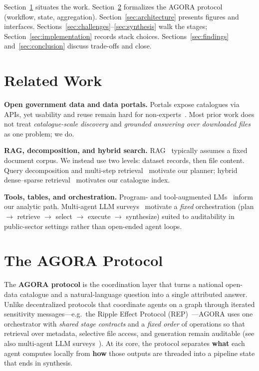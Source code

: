 \documentclass[sigconf,anonymous]{acmart}
\begin{document}
Section~\ref{sec:related} situates the work. Section~\ref{sec:protocol} formalizes the AGORA protocol (workflow, state, aggregation). Section~\ref{sec:architecture} presents figures and interfaces. Sections~\ref{sec:challenges}--\ref{sec:synthesis} walk the stages; Section~\ref{sec:implementation} records stack choices. Sections~\ref{sec:findings} and~\ref{sec:conclusion} discuss trade-offs and close.

\section{Related Work}
\label{sec:related}

\textbf{Open government data and data portals.} Portals expose catalogues via APIs, yet usability and reuse remain hard for non-experts~\cite{nikiforova2021usability, molodtsov2024usability, wang2023ogd}. Most prior work does not treat \emph{catalogue-scale discovery} and \emph{grounded answering over downloaded files} as one problem; we do.

\textbf{RAG, decomposition, and hybrid search.} RAG~\cite{lewis2020rag, gao2023rag, huang2024rag} typically assumes a fixed document corpus. We instead use two levels: dataset records, then file content. Query decomposition and multi-step retrieval~\cite{xiong2021multihop, wolfson2020break, fu2021decomposing, zhu2024fanoutqa, ammann2025decomposition} motivate our planner; hybrid dense--sparse retrieval~\cite{lee2023hybrid, wang2024rag, zhuang2024promptreps, gao2023dense} motivates our catalogue index.

\textbf{Tools, tables, and orchestration.} Program- and tool-augmented LMs~\cite{gao2023pal, chen2022program, cheng2023binder, wang2024chainoftable, zhang2024reactable, zhang2025rlm} inform our analytic path. Multi-agent LLM surveys~\cite{li2024multiagent, yu2025agent} motivate a \emph{fixed} orchestration (plan $\rightarrow$ retrieve $\rightarrow$ select $\rightarrow$ execute $\rightarrow$ synthesize) suited to auditability in public-sector settings rather than open-ended agent loops.

\section{The AGORA Protocol}
\label{sec:protocol}

The \textbf{AGORA protocol} is the coordination layer that turns a national open-data catalogue and a natural-language question into a single attributed answer. Unlike decentralized protocols that coordinate agents on a graph through iterated sensitivity messages---e.g.\ the Ripple Effect Protocol (REP)~\cite{chopra2025ripple}---AGORA uses one orchestrator with \emph{shared stage contracts} and a \emph{fixed order} of operations so that retrieval over metadata, selective file access, and generation remain auditable (see also multi-agent LLM surveys~\cite{li2024multiagent, yu2025agent}). At its core, the protocol separates \textbf{what} each agent computes locally from \textbf{how} those outputs are threaded into a pipeline state that ends in synthesis.
\end{document}
